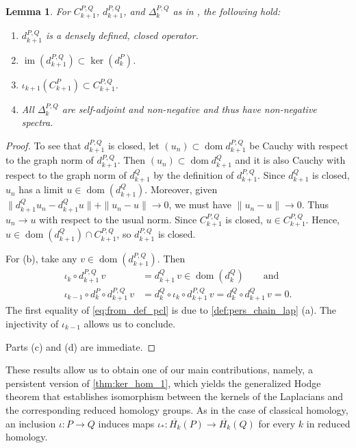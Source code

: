 \documentclass[11pt]{article}
\newtheorem{lemma}[theorem]{Lemma}
\theoremstyle{definition}
\theoremstyle{remark}
\DeclareMathOperator\dom{dom}
\DeclareMathOperator{\im}{im}
\begin{document}
\begin{lemma} \label{lem:pershodge}
For $C^{P,Q}_{k+1}$, $d^{P,Q}_{k+1}$, and $\Delta^{P,Q}_k$ as in , the following hold:

\begin{enumerate} 
    \item[(a)] $d^{P,Q}_{k+1}$ is a densely defined, closed operator.
    \item[(b)] $\im(d^{P,Q}_{k+1}) \subset \ker(d_k^P)$.
    \item[(c)] $\iota_{k+1}(C_{k+1}^P) \subset C_{k+1}^{P,Q}$.
    \item[(d)]  All $\Delta_k^{P,Q}$ are self-adjoint and non-negative and thus have non-negative spectra.
\end{enumerate}
\end{lemma}

\begin{proof}
To see that $d_{k+1}^{P,Q}$ is closed, let $(u_n)\subset \dom d^{P,Q}_{k+1}$ be Cauchy with respect to the graph norm of $d^{P,Q}_{k+1}$. Then $(u_n)\subset \dom d^{Q}_{k+1}$ and it is also Cauchy with respect to the graph norm of $d^{Q}_{k+1}$ by the definition of $d^{P,Q}_{k+1}$. Since $d^{Q}_{k+1}$ is closed, $u_n$ has a limit $u\in \dom(d^Q_{k+1})$. Moreover, given $\|d^{Q}_{k+1}u_n-d^{Q}_{k+1}u\|+\|u_n-u\|\to 0$, we must have $\|u_n-u\|\to 0$. Thus $u_n\to u$ with respect to the usual norm. Since $C^{P,Q}_{k+1}$ is closed, $u\in C^{P,Q}_{k+1}$. Hence, $u\in \dom(d^Q_{k+1})\cap C^{P,Q}_{k+1}$, so $d_{k+1}^{P,Q}$ is closed.

For (b), take any $v \in \dom(d_{k+1}^{P,Q})$. Then 
\begin{align}
    \iota_{k} \circ d_{k+1}^{P,Q} \, v&=d_{k+1}^Q  \,v \in \dom(d_k^Q) \qquad \text {and} \nonumber\\
    \iota_{k-1} \circ d_k^P \circ d_{k+1}^{P,Q} \, v&=d_k^Q \circ \iota_{k} \circ d_{k+1}^{P,Q} \, v = d_k^Q \circ d_{k+1}^Q  \,v =0. \label{eq:from_def_pcl}
\end{align}
The first equality of \cref{eq:from_def_pcl} is due to \cref{def:pers_chain_lap} (a). The injectivity of $\iota_{k-1}$ allows us to conclude.

Parts (c) and (d) are immediate.
\end{proof}

These results allow us to obtain one of our main contributions, namely, a persistent version of \cref{thm:ker_hom_1}, which yields the generalized Hodge theorem that establishes isomorphism between the kernels of the Laplacians and the corresponding reduced homology groups.  As in the case of classical homology, an inclusion $\iota: P \rightarrow Q$ induces maps $\iota_{*}: \overline{H_{k}}(P) \to \overline{H_{k}}(Q)$ for every $k$ in reduced homology.
\end{document}
